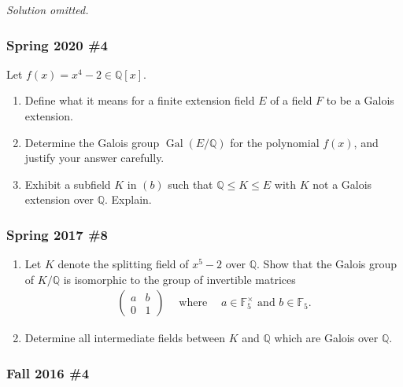 
\emph{Solution omitted.}

\hypertarget{spring-2020-4}{%
\subsubsection{Spring 2020 \#4}\label{spring-2020-4}}

Let \(f(x) = x^4-2 \in {\mathbb{Q}}[x]\).

\begin{enumerate}
\def\labelenumi{\alph{enumi}.}
\item
  Define what it means for a finite extension field \(E\) of a field
  \(F\) to be a Galois extension.
\item
  Determine the Galois group \({ \operatorname{Gal}} (E/{\mathbb{Q}})\)
  for the polynomial \(f(x)\), and justify your answer carefully.
\item
  Exhibit a subfield \(K\) in \((b)\) such that
  \({\mathbb{Q}}\leq K \leq E\) with \(K\) not a Galois extension over
  \({\mathbb{Q}}\). Explain.
\end{enumerate}

\hypertarget{spring-2017-8}{%
\subsubsection{Spring 2017 \#8}\label{spring-2017-8}}

\begin{enumerate}
\def\labelenumi{\alph{enumi}.}
\item
  Let \(K\) denote the splitting field of \(x^5 - 2\) over
  \({\mathbb{Q}}\). Show that the Galois group of \(K/{\mathbb{Q}}\) is
  isomorphic to the group of invertible matrices
  \begin{align*}
  \left(\begin{array}{ll}
  a & b \\
  0 & 1
  \end{array}\right) 
  {\quad \operatorname{where} \quad} a\in {\mathbb{F}}_5^{\times}\text{ and } b\in {\mathbb{F}}_5
  .\end{align*}
\item
  Determine all intermediate fields between \(K\) and \({\mathbb{Q}}\)
  which are Galois over \({\mathbb{Q}}\).
\end{enumerate}

\hypertarget{fall-2016-4}{%
\subsubsection{Fall 2016 \#4}\label{fall-2016-4}}


